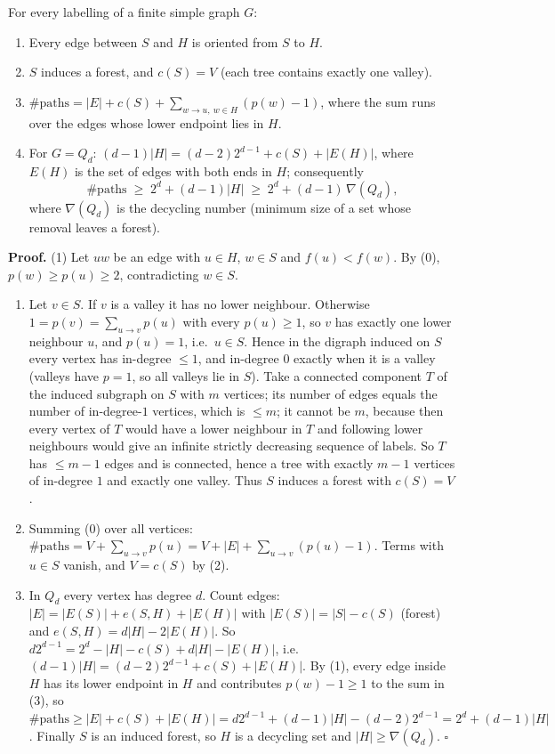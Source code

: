 For every labelling of a finite simple graph \(G\):

\begin{enumerate}
\def\labelenumi{\arabic{enumi}.}
\tightlist
\item
  Every edge between \(S\) and \(H\) is oriented from \(S\) to \(H\).
\item
  \(S\) induces a forest, and \(c(S)=V\) (each tree contains exactly one
  valley).
\item
  \(\#\text{paths}=|E|+c(S)+\sum_{w\to u,\ w\in H}(p(w)-1)\), where the
  sum runs over the edges whose lower endpoint lies in \(H\).
\item
  For \(G=Q_d\): \((d-1)|H|=(d-2)2^{d-1}+c(S)+|E(H)|\), where \(E(H)\)
  is the set of edges with both ends in \(H\); consequently
  \[\#\text{paths}\;\ge\;2^d+(d-1)|H|\;\ge\;2^d+(d-1)\,\nabla(Q_d),\]
  where \(\nabla(Q_d)\) is the decycling number (minimum size of a set
  whose removal leaves a forest).
\end{enumerate}

\textbf{Proof.} (1) Let \(uw\) be an edge with \(u\in H\), \(w\in S\)
and \(f(u)<f(w)\). By (0), \(p(w)\ge p(u)\ge 2\), contradicting
\(w\in S\).

\begin{enumerate}
\def\labelenumi{(\arabic{enumi})}
\setcounter{enumi}{1}
\item
  Let \(v\in S\). If \(v\) is a valley it has no lower neighbour.
  Otherwise \(1=p(v)=\sum_{u\to v}p(u)\) with every \(p(u)\ge1\), so
  \(v\) has exactly one lower neighbour \(u\), and \(p(u)=1\),
  i.e.~\(u\in S\). Hence in the digraph induced on \(S\) every vertex
  has in-degree \(\le 1\), and in-degree \(0\) exactly when it is a
  valley (valleys have \(p=1\), so all valleys lie in \(S\)). Take a
  connected component \(T\) of the induced subgraph on \(S\) with \(m\)
  vertices; its number of edges equals the number of in-degree-\(1\)
  vertices, which is \(\le m\); it cannot be \(m\), because then every
  vertex of \(T\) would have a lower neighbour in \(T\) and following
  lower neighbours would give an infinite strictly decreasing sequence
  of labels. So \(T\) has \(\le m-1\) edges and is connected, hence a
  tree with exactly \(m-1\) vertices of in-degree \(1\) and exactly one
  valley. Thus \(S\) induces a forest with \(c(S)=V\).
\item
  Summing (0) over all vertices:
  \(\#\text{paths}=V+\sum_{u\to v}p(u)=V+|E|+\sum_{u\to v}(p(u)-1)\).
  Terms with \(u\in S\) vanish, and \(V=c(S)\) by (2).
\item
  In \(Q_d\) every vertex has degree \(d\). Count edges:
  \(|E|=|E(S)|+e(S,H)+|E(H)|\) with \(|E(S)|=|S|-c(S)\) (forest) and
  \(e(S,H)=d|H|-2|E(H)|\). So \(d2^{d-1}=2^d-|H|-c(S)+d|H|-|E(H)|\),
  i.e.~\((d-1)|H|=(d-2)2^{d-1}+c(S)+|E(H)|\). By (1), every edge inside
  \(H\) has its lower endpoint in \(H\) and contributes \(p(w)-1\ge1\)
  to the sum in (3), so
  \(\#\text{paths}\ge|E|+c(S)+|E(H)|=d2^{d-1}+(d-1)|H|-(d-2)2^{d-1}=2^d+(d-1)|H|\).
  Finally \(S\) is an induced forest, so \(H\) is a decycling set and
  \(|H|\ge\nabla(Q_d)\). \(\square\)
\end{enumerate}

